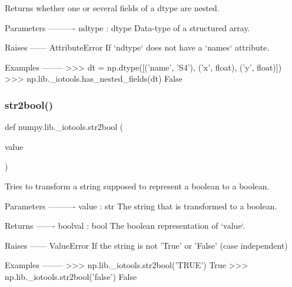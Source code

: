 \begin{DoxyVerb}Returns whether one or several fields of a dtype are nested.

Parameters
----------
ndtype : dtype
    Data-type of a structured array.

Raises
------
AttributeError
    If `ndtype` does not have a `names` attribute.

Examples
--------
>>> dt = np.dtype([('name', 'S4'), ('x', float), ('y', float)])
>>> np.lib._iotools.has_nested_fields(dt)
False\end{DoxyVerb}
 \mbox{\label{namespacenumpy_1_1lib_1_1__iotools_a4ecb79a687b0f134273b11e96703f23f}} 
\subsubsection{\texorpdfstring{str2bool()}{str2bool()}}
{\footnotesize\ttfamily def numpy.\+lib.\+\_\+iotools.\+str2bool (\begin{DoxyParamCaption}\item[{}]{value }\end{DoxyParamCaption})}

\begin{DoxyVerb}Tries to transform a string supposed to represent a boolean to a boolean.

Parameters
----------
value : str
    The string that is transformed to a boolean.

Returns
-------
boolval : bool
    The boolean representation of `value`.

Raises
------
ValueError
    If the string is not 'True' or 'False' (case independent)

Examples
--------
>>> np.lib._iotools.str2bool('TRUE')
True
>>> np.lib._iotools.str2bool('false')
False\end{DoxyVerb}
 